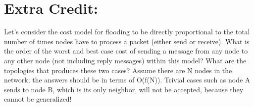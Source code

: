 \documentclass[a4paper]{article}
\begin{document}
\section*{Extra Credit:}
Let's consider the cost model for flooding to be directly proportional to the total number of times nodes have to process a packet (either send or receive). What is the order of the worst and best case cost of sending a message from any node to any other node (not including reply messages) within this model? What are the topologies that produces these two cases? Assume there are N nodes in the network; the answers should be in terms of O(f(N)). Trivial cases such as node A sends to node B, which is its only neighbor, will not be accepted, because they cannot be generalized!
\end{document}
